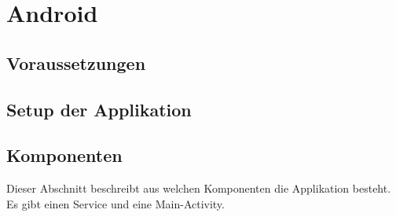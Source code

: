 ﻿\section{Android}

\subsection{Voraussetzungen}

\subsection{Setup der Applikation}

\subsection{Komponenten}

Dieser Abschnitt beschreibt aus welchen Komponenten die Applikation besteht. Es gibt einen Service und eine Main-Activity.